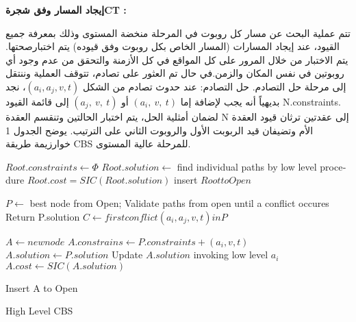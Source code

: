 \textbf{إيجاد المسار وفق شجرةCT :}

تتم عملية البحث عن مسار كل روبوت في المرحلة منخضة المستوى وذلك بمعرفة جميع القيود، عند إيجاد المسارات (المسار الخاص بكل روبوت وفق قيوده) يتم اختبارصحتها. يتم الاختبار من خلال المرور على كل المواقع في كل الأزمنة والتحقق من عدم وجود أي روبوتين في نفس المكان والزمن.في حال تم العثور على تصادم، تتوقف العملية وننتقل إلى مرحلة حل التصادم.
حل التصادم:
عند حدوث تصادم من الشكل $ (a_i,a_j, v,t) $، نجد بديهياً أنه يجب لإضافة إما $ (a_i,\ v,\ t) $ أو $ (a_j,\ v,\ t) $ إلى قائمة القيود N.constraints. لضمان أمثلية الحل، يتم اختبار الحالتين وتنقسم العقدة N  إلى عقدتين ترثان قيود العقدة الأم وتضيفان قيد الربوبت الأول والروبوت الثاني على الترتيب. يوضح الجدول 1 خوارزيمة طريقة CBS للمرحلة عالية المستوى.

\begin{english}
	\begin{algorithm}[H]
		\DontPrintSemicolon
		
		
		$Root.constraints \leftarrow \Phi$\;
		 $Root.solution \leftarrow$ find individual paths by low level procedure\;
		 $Root.cost = SIC(Root.solution)$\;
		 insert $RoottoOpen$\;
		
		{
			 $P \leftarrow $ best node from Open;\;
			 Validate paths from open until a conflict occures\;
			{
				 Return P.solution
			}
			 $C \leftarrow first conflict (a_i, a_j, v,t) in P$\;
			
			{
				 $A \leftarrow new node$ \;
				 $A.constrains \leftarrow P.constraints + (a_i, v, t)$\;
				 $A.solution \leftarrow P.solution$\;
				 Update $A.solution $ invoking low level $a_i$\;
				 $A.cost \leftarrow SIC(A.solution)$\;
				{
					
					 Insert A to Open\;
				}
			}
		}
		\caption{High Level CBS}
	\end{algorithm}

\end{english}

